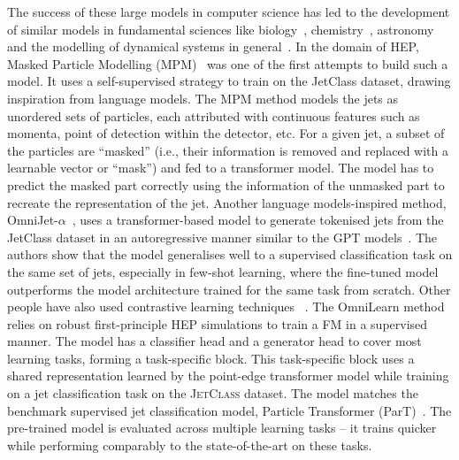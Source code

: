 The success of these large models in computer science has led to the development of similar models in fundamental sciences like biology~\cite{doi:10.1073/pnas.2016239118, ross2022largescalechemicallanguagerepresentations,doi:10.1021/acs.jcim.4c01396}, chemistry~\cite{liao2024wordsmoleculessurveylarge,Irwin_2022}, astronomy~\cite{Parker_2024} and the modelling of dynamical systems in general~\cite{subramanian2023foundationmodelsscientificmachine, mccabe2024multiplephysicspretrainingphysical}. In the domain of HEP, Masked Particle Modelling (MPM)~\cite{Golling:2024abg, Leigh:2024ked} was one of the first attempts to build such a model. It uses a self-supervised strategy to train on the JetClass dataset, drawing inspiration from language models. The MPM method models the jets as unordered sets of particles, each attributed with continuous features such as momenta, point of detection within the detector, etc. For a given jet, a subset of the particles are ``masked'' (i.e., their information is removed and replaced with a learnable vector or ``mask'') and fed to a transformer model. The model has to predict the masked part correctly using the information of the unmasked part to recreate the representation of the jet. Another language models-inspired method, OmniJet-$\alpha$~\cite{Birk:2024knn}, uses a transformer-based model to generate tokenised jets from the JetClass dataset in an autoregressive manner similar to the GPT models~\cite{brown2020languagemodelsfewshotlearners}. The authors show that the model generalises well to a supervised classification task on the same set of jets, especially in few-shot learning, where the fine-tuned model outperforms the model architecture trained for the same task from scratch. Other people have also used contrastive learning techniques ~\cite{Dillon:2021gag,Dillon:2022tmm,Dillon:2023zac,Harris:2024sra}. The OmniLearn method~\cite{Mikuni:2024qsr} relies on robust first-principle HEP simulations to train a FM in a supervised manner. The model has a classifier head and a generator head to cover most learning tasks, forming a task-specific block. This task-specific block uses a shared representation learned by the point-edge transformer model while training on a jet classification task on the \textsc{JetClass} dataset. The model matches the benchmark supervised jet classification model, Particle Transformer (ParT)~\cite{Qu2022ParticleTF}. The pre-trained model is evaluated across multiple learning tasks -- it trains quicker while performing comparably to the state-of-the-art on these tasks. 

